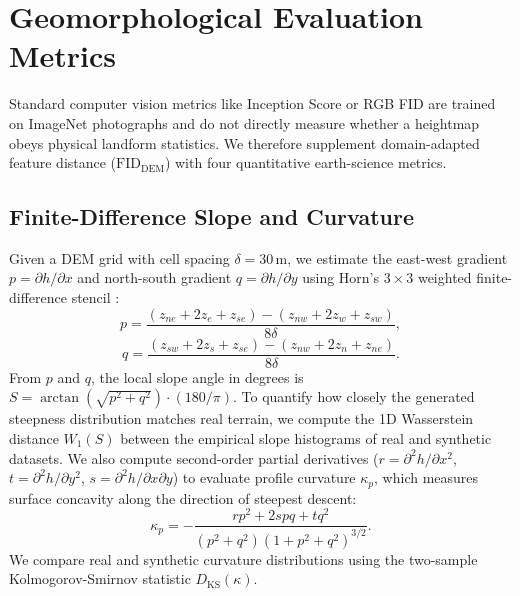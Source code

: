 \documentclass[conference]{IEEEtran}
\begin{document}
\section{Geomorphological Evaluation Metrics}
Standard computer vision metrics like Inception Score or RGB FID are trained on ImageNet photographs and do not directly measure whether a heightmap obeys physical landform statistics. We therefore supplement domain-adapted feature distance ($\text{FID}_{\text{DEM}}$) with four quantitative earth-science metrics.

\subsection{Finite-Difference Slope and Curvature}
Given a DEM grid with cell spacing $\delta = 30$\,m, we estimate the east-west gradient $p = \partial h / \partial x$ and north-south gradient $q = \partial h / \partial y$ using Horn's $3\times 3$ weighted finite-difference stencil \cite{b1}:
\begin{equation}
p = \frac{(z_{ne} + 2 z_e + z_{se}) - (z_{nw} + 2 z_w + z_{sw})}{8 \delta}, \label{eq:p}
\end{equation}
\begin{equation}
q = \frac{(z_{sw} + 2 z_s + z_{se}) - (z_{nw} + 2 z_n + z_{ne})}{8 \delta}. \label{eq:q}
\end{equation}
From $p$ and $q$, the local slope angle in degrees is $S = \arctan(\sqrt{p^2 + q^2}) \cdot (180/\pi)$. To quantify how closely the generated steepness distribution matches real terrain, we compute the 1D Wasserstein distance $W_1(S)$ between the empirical slope histograms of real and synthetic datasets. We also compute second-order partial derivatives ($r = \partial^2 h/\partial x^2$, $t = \partial^2 h/\partial y^2$, $s = \partial^2 h/\partial x \partial y$) to evaluate profile curvature $\kappa_p$, which measures surface concavity along the direction of steepest descent:
\begin{equation}
\kappa_p = -\frac{r p^2 + 2 s p q + t q^2}{(p^2 + q^2)(1 + p^2 + q^2)^{3/2}}. \label{eq:kp}
\end{equation}
We compare real and synthetic curvature distributions using the two-sample Kolmogorov-Smirnov statistic $D_{\text{KS}}(\kappa)$.
\end{document}
